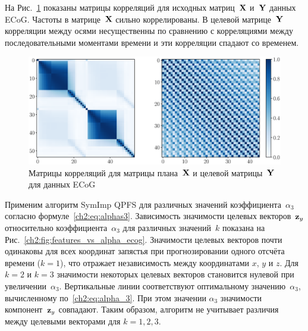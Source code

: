 На Рис.~\ref{ch2:fig:corr_matrix} показаны матрицы корреляций для исходных матриц~$\mathbf{X}$ и~$\mathbf{Y}$ данных ECoG. Частоты в матрице~$\mathbf{X}$ сильно коррелированы. 
В целевой матрице~$\mathbf{Y}$ корреляции между осями несущественны по сравнению с корреляциями между последовательными моментами времени и эти корреляции спадают со временем.
\begin{figure}[ht]
	\includegraphics[width=\linewidth]{figs/ch2/corr_matrix}
	\caption{Матрицы корреляций для матрицы плана~$\mathbf{X}$ и целевой матрицы~$\mathbf{Y}$ для данных ECoG}
	\label{ch2:fig:corr_matrix}
\end{figure}

Применим алгоритм SymImp QPFS для различных значений коэффициента~$\alpha_3$ согласно формуле~\eqref{ch2:eq:alphas3}.
Зависимость значимости целевых векторов~$\mathbf{z}_y$ относительно коэффициента~$\alpha_3$ для различных значений~$k$ показана на Рис.~\ref{ch2:fig:features_vs_alpha_ecog}.
Значимости целевых векторов почти одинаковы для всех координат запястья при прогнозировании одного отсчёта времени ($k = 1$), 
что отражает независимость между координатами $x$, $y$ и $z$.
Для $k = 2$ и $k = 3$ значимости некоторых целевых векторов становится нулевой при увеличении~$\alpha_3$.
Вертикальные линии соответствуют оптимальному значению~$\alpha_3$, вычисленному по~\eqref{ch2:eq:alpha_3}. 
При этом значении $\alpha_3$ значимости компонент~$\mathbf{z}_y$ совпадают. 
Таким образом, алгоритм не учитывает различия между целевыми векторами для $k=1, 2, 3$.


